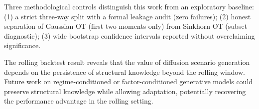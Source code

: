 \documentclass{article}
\begin{document}
Three methodological controls distinguish this work from an exploratory baseline:
(1) a strict three-way split with a formal leakage audit (zero failures);
(2) honest separation of Gaussian OT (first-two-moments only) from Sinkhorn OT
(subset diagnostic);
(3) wide bootstrap confidence intervals reported without overclaiming significance.

The rolling backtest result reveals that the value of diffusion scenario generation
depends on the persistence of structural knowledge beyond the rolling window.
Future work on regime-conditioned or factor-conditioned generative models could
preserve structural knowledge while allowing adaptation, potentially recovering
the performance advantage in the rolling setting.



\end{document}
